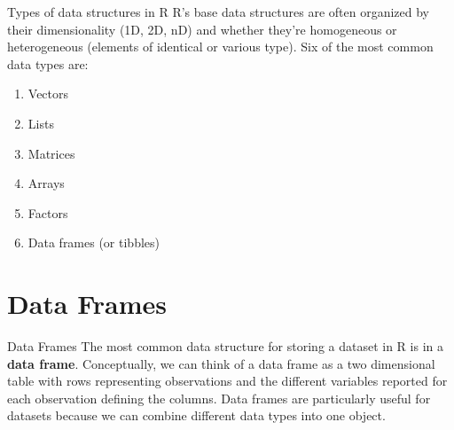 \documentclass[
  ignorenonframetext,
]{beamer}
\providecommand{\tightlist}{%
  \setlength{\itemsep}{0pt}\setlength{\parskip}{0pt}}
\begin{document}

\begin{frame}{Types of data structures in R}
\protect\hypertarget{types-of-data-structures-in-r}{}
R's base data structures are often organized by their dimensionality
(1D, 2D, nD) and whether they're homogeneous or heterogeneous (elements
of identical or various type). Six of the most common data types are:

\begin{enumerate}
\tightlist
\item
  Vectors
\item
  Lists
\item
  Matrices
\item
  Arrays
\item
  Factors
\item
  Data frames (or tibbles)
\end{enumerate}
\end{frame}

\hypertarget{data-frames}{%
\section{Data Frames}\label{data-frames}}

\begin{frame}{Data Frames}
\protect\hypertarget{data-frames-1}{}
The most common data structure for storing a dataset in R is in a
\textbf{data frame}. Conceptually, we can think of a data frame as a two
dimensional table with rows representing observations and the different
variables reported for each observation defining the columns. Data
frames are particularly useful for datasets because we can combine
different data types into one object.
\end{frame}
\end{document}

